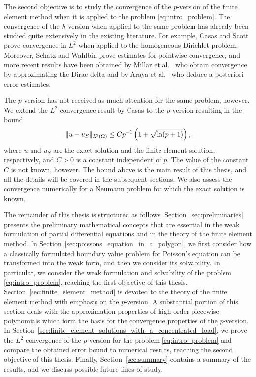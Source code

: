 \documentclass[english, 12pt, a4paper, sci, utf8, a-2b, online]{aaltothesis}
\theoremstyle{definition}
\theoremstyle{plain}
\DeclarePairedDelimiter\norm{\lVert}{\rVert}
\numberwithin{equation}{section}
\begin{document}
The second objective is to study the convergence of the $p$-version of the finite element method
when it is applied to the problem \eqref{eq:intro_problem}.
The convergence of the $h$-version
when applied to the same problem has already been studied
quite extensively in the existing literature.
For example, Casas \cite{casas1985} and Scott \cite{scott1973}
prove convergence in $L^2$ when applied to the homogeneous Dirichlet problem.
Moreover, Schatz and Wahlbin \cite{schatzwahlbin1977} prove estimates for pointwise convergence, and
more recent results have been obtained by Millar et al.\ \cite{millarmuga2021}
who obtain convergence by approximating the
Dirac delta and by Araya et al.\ \cite{arayabehrens2006} who deduce
a posteriori error estimates.

The $p$-version has not received as much attention for the same problem, however.
We extend the $L^2$ convergence result by Casas to the $p$-version resulting in the bound
\begin{equation*}
    \norm{u - u_S}_{L^2(\Omega)} \leq C p^{-1} \left( 1 + \sqrt{\ln(p+1)} \right),
\end{equation*}
where $u$ and $u_S$ are the exact solution and the finite element solution, respectively,
and $C > 0$ is a constant independent of $p$.
The value of the constant $C$ is not known, however.
The bound above is the main result of this thesis,
and all the details will be covered in the subsequent sections.
We also assess the convergence numerically for a Neumann problem for which
the exact solution is known.

The remainder of this thesis is structured as follows.
Section~\ref{sec:preliminaries} presents the preliminary mathematical
concepts that are essential in the weak formulation of partial differential equations
and in the theory of the finite element method.
In Section~\ref{sec:poissons_equation_in_a_polygon},
we first consider how a classically formulated boundary value problem for Poisson's equation
can be transformed into the weak form, and then we consider its solvability.
In particular, we consider the weak formulation and solvability of
the problem \eqref{eq:intro_problem}, reaching the first objective of this thesis.
Section~\ref{sec:finite_element_method} is devoted to the theory
of the finite element method with emphasis on the $p$-version.
A substantial portion of this section deals with the approximation properties
of high-order piecewise polynomials which form the basis for the
convergence properties of the $p$-version.
In Section~\ref{sec:finite_element_solutions_with_a_concentrated_load},
we prove the $L^2$ convergence of the $p$-version
for the problem \eqref{eq:intro_problem} and compare the obtained error
bound to numerical results, reaching the second objective of this thesis.
Finally, Section~\ref{sec:summary} contains a summary of the results, and
we discuss possible future lines of study.
\end{document}
